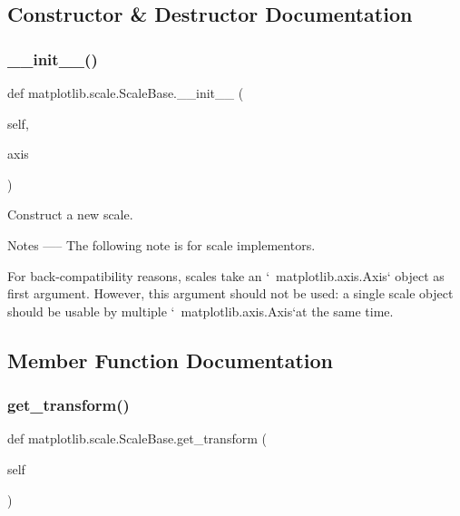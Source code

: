 \subsection{Constructor \& Destructor Documentation}
\mbox{\label{classmatplotlib_1_1scale_1_1ScaleBase_a456a86d8e26a298462ae1dcc5a4dfa78}} 
\subsubsection{\texorpdfstring{\+\_\+\+\_\+init\+\_\+\+\_\+()}{\_\_init\_\_()}}
{\footnotesize\ttfamily def matplotlib.\+scale.\+Scale\+Base.\+\_\+\+\_\+init\+\_\+\+\_\+ (\begin{DoxyParamCaption}\item[{}]{self,  }\item[{}]{axis }\end{DoxyParamCaption})}

\begin{DoxyVerb}Construct a new scale.

Notes
-----
The following note is for scale implementors.

For back-compatibility reasons, scales take an `~matplotlib.axis.Axis`
object as first argument.  However, this argument should not
be used: a single scale object should be usable by multiple
`~matplotlib.axis.Axis`\es at the same time.
\end{DoxyVerb}
 

\subsection{Member Function Documentation}
\mbox{\label{classmatplotlib_1_1scale_1_1ScaleBase_acf648f9d8a75c9acd5d89dbbca10668c}} 
\subsubsection{\texorpdfstring{get\+\_\+transform()}{get\_transform()}}
{\footnotesize\ttfamily def matplotlib.\+scale.\+Scale\+Base.\+get\+\_\+transform (\begin{DoxyParamCaption}\item[{}]{self }\end{DoxyParamCaption})}

